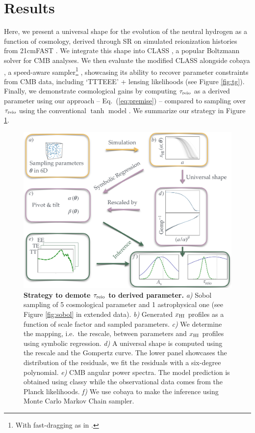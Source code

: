 \section*{Results}

Here, we present a universal shape for the evolution of the neutral
hydrogen as a function of cosmology, derived through SR on simulated
reionization histories from 21cmFAST \cite{Murray2020}.
We integrate this shape into CLASS \cite{Blas2011}, a popular Boltzmann
solver for CMB analyses.
We then evaluate the modified CLASS alongside cobaya \cite{Torrado2020},
a speed-aware sampler\footnote{With fast-dragging as in
\cite{Neal2005}.} \cite{Lewis2002, Lewis2013}, showcasing its ability to
recover parameter constraints from CMB data, including `TTTEEE' +
lensing likelihoods \cite{Planck2020c, Planck2020d} (see Figure
\ref{fig:tg}).
Finally, we demonstrate cosmological gains by computing $\tau_{\mathrm{reio}}$ as
a derived parameter using our approach -- Eq.~(\ref{eq:premise}) --
compared to sampling over $\tau_{\mathrm{reio}}$ using the conventional $\tanh$
model \cite{Lewis2008}.
We summarize our strategy in Figure \ref{fig:big}.

\begin{figure}
\centering
\includegraphics[width=\linewidth]{figs/big_fig.pdf}
\caption{\textbf{Strategy to demote $\tau_{\mathrm{reio}}$ to derived parameter.}
\emph{a)} Sobol sampling of 5 cosmological parameter and 1 astrophysical
one (see Figure \ref{fig:sobol} in extended data).
\emph{b)} Generated $x_{\mathrm{HI}}$ profiles as a function of scale factor and
sampled parameters.
\emph{c)} We determine the mapping, i.e.\ the rescale, between
parameters and $x_{\mathrm{HI}}$ profiles using symbolic regression.
\emph{d)} A universal shape is computed using the rescale and the
Gompertz curve.
The lower panel showcases the distribution of the residuals, we fit the
residuals with a six-degree polynomial.
\emph{e)}  CMB angular power spectra.
The model prediction is obtained using classy while the observational
data comes from the Planck likelihoods.
\emph{f)} We use cobaya to make the inference using Monte Carlo Markov
Chain sampler.}
\label{fig:big}
\end{figure}

